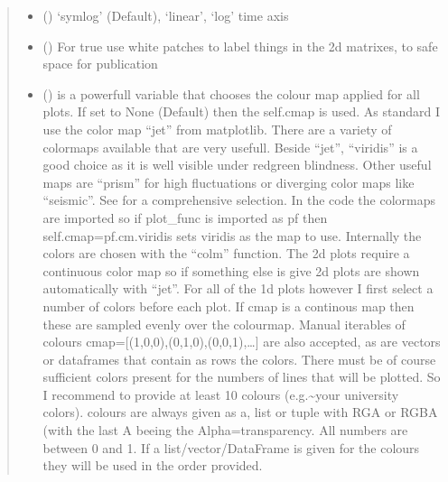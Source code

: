 \documentclass[letterpaper,10pt,english]{sphinxmanual}
\begin{document}
\begin{fulllineitems}
\begin{fulllineitems}
\begin{quote}
\begin{description}
\begin{itemize}
\item {} 
 (\sphinxstyleliteralemphasis{\sphinxupquote{, }}) \textendash{} ‘symlog’ (Default), ‘linear’, ‘log’ time axis

\item {} 
 (\sphinxstyleliteralemphasis{\sphinxupquote{, }}) \textendash{} For true use white patches to label things in the 2d matrixes, to safe
space for publication

\item {} 
 (\sphinxstyleliteralemphasis{\sphinxupquote{, }}) \textendash{} is a powerfull variable that chooses the colour map applied for all plots. If set to
None (Default) then the self.cmap is used.
As standard I use the color map “jet” from matplotlib. There are a variety of colormaps
available that are very usefull. Beside “jet”, “viridis” is a good choice as it is well
visible under red\sphinxhyphen{}green blindness. Other useful maps are “prism” for high fluctuations
or diverging color maps like “seismic”.
See  for a comprehensive
selection. In the code the colormaps are imported so if plot\_func is imported as pf then
self.cmap=pf.cm.viridis sets viridis as the map to use. Internally the colors are chosen
with the “colm” function. The 2d plots require a continuous color map so if something
else is give 2d plots are shown automatically with “jet”. For all of the 1d plots however
I first select a number of colors before each plot. If cmap is a continous map then these
are sampled evenly over the colourmap. Manual iterables of colours
cmap={[}(1,0,0),(0,1,0),(0,0,1),…{]} are also accepted, as are vectors or dataframes that
contain as rows the colors. There must be of course sufficient colors present for
the numbers of lines that will be plotted. So I recommend to provide at least 10 colours
(e.g.\textasciitilde{}your university colors). colours are always given as a, list or tuple with RGA or RGBA
(with the last A beeing the Alpha=transparency. All numbers are between 0 and 1.
If a list/vector/DataFrame is given for the colours they will be used in the order provided.


\end{itemize}
\end{description}
\end{quote}
\end{fulllineitems}
\end{fulllineitems}
\end{document}

